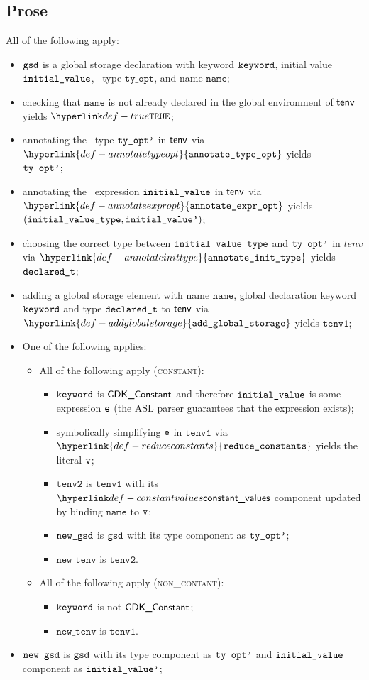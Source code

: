 \documentclass{book}
\newcommand\ProseOrTypeError[0]{\ProseTerminateAs{\TypeErrorConfig}}
\newcommand\annotatetypeopt[0]{\hyperlink{def-annotatetypeopt}{\texttt{annotate\_type\_opt}}}
\newcommand\annotateexpropt[0]{\hyperlink{def-annotateexpropt}{\texttt{annotate\_expr\_opt}}}
\newcommand\annotateinittype[0]{\hyperlink{def-annotateinittype}{\texttt{annotate\_init\_type}}}
\newcommand\addglobalstorage[0]{\hyperlink{def-addglobalstorage}{\texttt{add\_global\_storage}}}
\newcommand\reduceconstants[0]{\hyperlink{def-reduceconstants}{\texttt{reduce\_constants}}}
\newcommand\newtenv[0]{\texttt{new\_tenv}}
\newcommand\tenvone[0]{\texttt{tenv1}}
\newcommand\tenvtwo[0]{\texttt{tenv2}}
\newcommand\tyopt[0]{\texttt{ty\_opt}}
\newcommand\name[0]{\texttt{name}}
\begin{document}
\subsection{Prose}
All of the following apply:
\begin{itemize}
  \item $\texttt{gsd}$ is a global storage declaration with keyword $\texttt{keyword}$, initial value \\ $\texttt{initial\_value}$,
        \optional\ type $\tyopt$, and name $\name$;
  \item checking that $\name$ is not already declared in the global environment of $\textsf{tenv}$ yields $\True$\ProseOrTypeError;
  \item annotating the \optional\ type $\texttt{ty\_opt'}$ in $\textsf{tenv}$ via $\annotatetypeopt$ yields \\
        $\texttt{ty\_opt'}$\ProseOrTypeError;
  \item annotating the \optional\ expression $\texttt{initial\_value}$ in $\textsf{tenv}$ via $\annotateexpropt$ yields
        $(\texttt{initial\_value\_type}, \texttt{initial\_value'})$\ProseOrTypeError;
  \item choosing the correct type between $\texttt{initial\_value\_type}$ and $\texttt{ty\_opt'}$ in $tenv$ via $\annotateinittype$ yields
        $\texttt{declared\_t}$;
  \item adding a global storage element with name $\name$, global declaration keyword \\ $\texttt{keyword}$ and type $\texttt{declared\_t}$
        to $\textsf{tenv}$ via $\addglobalstorage$ yields $\tenvone$\ProseOrTypeError;
  \item One of the following applies:
  \begin{itemize}
    \item All of the following apply (\textsc{constant}):
    \begin{itemize}
      \item $\texttt{keyword}$ is $\textsf{GDK\_Constant}$ and therefore $\texttt{initial\_value}$ is some expression $\texttt{e}$ (the ASL parser guarantees
            that the expression exists);
      \item symbolically simplifying $\texttt{e}$ in $\tenvone$ via $\reduceconstants$ yields the literal $\texttt{v}$\ProseOrTypeError;
      \item $\tenvtwo$ is $\tenvone$ with its $\constantvalues$ component updated by binding $\name$ to $\texttt{v}$;
      \item $\texttt{new\_gsd}$ is $\texttt{gsd}$ with its type component as $\texttt{ty\_opt'}$;
      \item $\newtenv$ is $\tenvtwo$.
    \end{itemize}

    \item All of the following apply (\textsc{non\_contant}):
    \begin{itemize}
      \item $\texttt{keyword}$ is not $\textsf{GDK\_Constant}$;
      \item $\newtenv$ is $\tenvone$.
    \end{itemize}
  \end{itemize}
  \item $\texttt{new\_gsd}$ is $\texttt{gsd}$ with its type component as $\texttt{ty\_opt'}$ and $\texttt{initial\_value}$ component as $\texttt{initial\_value'}$;
\end{itemize}
\end{document}
